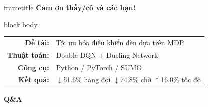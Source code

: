 \begin{frame}{}
  \vfill
  \begin{center}
    \begin{beamercolorbox}[sep=16pt, center, rounded=true, shadow=true]{frametitle}
      {\Huge \textbf{Cảm ơn thầy/cô và các bạn!}}
    \end{beamercolorbox}

    \vspace{20pt}

    \begin{beamercolorbox}[sep=10pt, center, rounded=true]{block body}
      \begin{tabular}{rl}
        \textbf{Đề tài:}    & Tối ưu hóa điều khiển đèn dựa trên MDP\\[4pt]
        \textbf{Thuật toán:}& Double DQN + Dueling Network\\[4pt]
        \textbf{Công cụ:}   & Python / PyTorch / SUMO\\[4pt]
        \textbf{Kết quả:}   & $\downarrow$51.6\% hàng đợi \quad $\downarrow$74.8\% chờ \quad $\uparrow$16.0\% tốc độ\\
      \end{tabular}
    \end{beamercolorbox}

    \vspace{16pt}
    {\large \textbf{Q\&A}}
  \end{center}
  \vfill
\end{frame}
